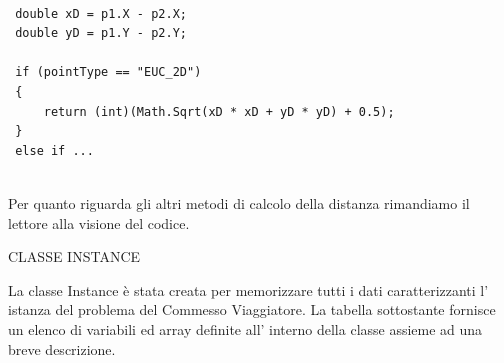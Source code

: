 \documentclass[11pt]{article}
\begin{document}
\begin{lstlisting}

 double xD = p1.X - p2.X;
 double yD = p1.Y - p2.Y;
 
 if (pointType == "EUC_2D")
 {
     return (int)(Math.Sqrt(xD * xD + yD * yD) + 0.5);
 }
 else if ...
            
\end{lstlisting}

Per quanto riguarda gli altri metodi di calcolo della distanza rimandiamo il lettore alla visione del codice.

\vspace{2\baselineskip}
CLASSE INSTANCE
\vspace{2\baselineskip}

La classe Instance \`e stata creata per  memorizzare tutti i dati caratterizzanti l' istanza del problema del Commesso Viaggiatore. La tabella sottostante fornisce un elenco di variabili ed array definite all' interno della classe assieme ad una breve descrizione. 
\end{document}
